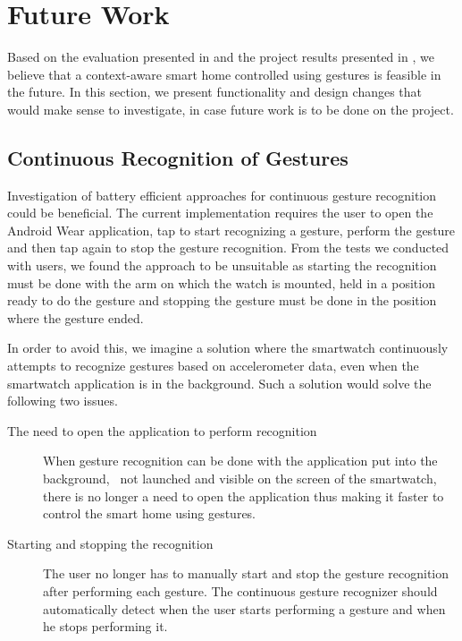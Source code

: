 \section{Future Work}
\label{sec:conclusion:future-work}

Based on the evaluation presented in  and the project results presented in , we believe that a context-aware smart home controlled using gestures is feasible in the future. 
In this section, we present functionality and design changes that would make sense to investigate, in case future work is to be done on the project.

\subsection{Continuous Recognition of Gestures}

Investigation of battery efficient approaches for continuous gesture recognition could be beneficial. The current implementation requires the user to open the Android Wear application, tap to start recognizing a gesture, perform the gesture and then tap again to stop the gesture recognition. From the tests we conducted with users, we found the approach to be unsuitable as starting the recognition must be done with the arm on which the watch is mounted, held in a position ready to do the gesture and stopping the gesture must be done in the position where the gesture ended.

In order to avoid this, we imagine a solution where the smartwatch continuously attempts to recognize gestures based on accelerometer data, even when the smartwatch application is in the background. Such a solution would solve the following two issues.

\begin{description}
\item[The need to open the application to perform recognition] When gesture recognition can be done with the application put into the background, \ie~not launched and visible on the screen of the smartwatch, there is no longer a need to open the application thus making it faster to control the smart home using gestures.
\item[Starting and stopping the recognition] The user no longer has to manually start and stop the gesture recognition after performing each gesture. The continuous gesture recognizer should automatically detect when the user starts performing a gesture and when he stops performing it.
\end{description}

